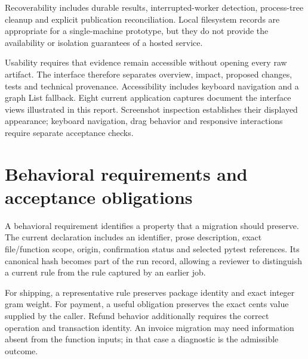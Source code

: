\documentclass[12pt,a4paper,oneside]{report}
\begin{document}
Recoverability includes durable results, interrupted-worker detection, process-tree cleanup and explicit publication reconciliation. Local filesystem records are appropriate for a single-machine prototype, but they do not provide the availability or isolation guarantees of a hosted service.

Usability requires that evidence remain accessible without opening every raw artifact. The interface therefore separates overview, impact, proposed changes, tests and technical provenance. Accessibility includes keyboard navigation and a graph List fallback. Eight current application captures document the interface views illustrated in this report. Screenshot inspection establishes their displayed appearance; keyboard navigation, drag behavior and responsive interactions require separate acceptance checks.

\section{Behavioral requirements and acceptance obligations}

A behavioral requirement identifies a property that a migration should preserve. The current declaration includes an identifier, prose description, exact file/function scope, origin, confirmation status and selected pytest references. Its canonical hash becomes part of the run record, allowing a reviewer to distinguish a current rule from the rule captured by an earlier job.

For shipping, a representative rule preserves package identity and exact integer gram weight. For payment, a useful obligation preserves the exact cents value supplied by the caller. Refund behavior additionally requires the correct operation and transaction identity. An invoice migration may need information absent from the function inputs; in that case a diagnostic is the admissible outcome.
\end{document}
